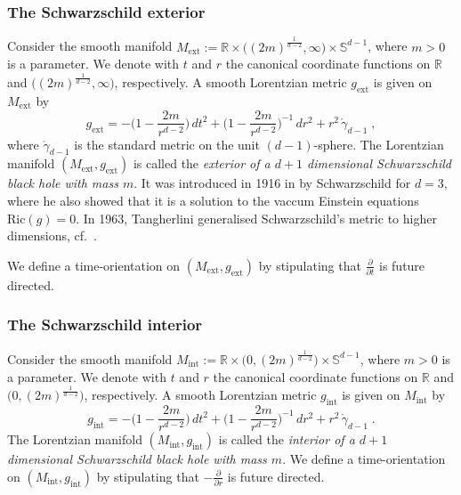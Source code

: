 \documentclass[reqno]{article}
\newcommand{\R}{\mathbb{R}}
\newcommand{\Mint}{M_{\mathrm{int}}}
\newcommand{\gint}{g_{\mathrm{int}}}
\newcommand{\Mext}{M_{\mathrm{ext}}}
\newcommand{\gext}{g_{\mathrm{ext}}}
\begin{document}
\subsubsection*{The Schwarzschild exterior}

Consider the smooth manifold $\Mext := \R \times \big((2m)^{\frac{1}{d-2}}, \infty\big) \times \mathbb{S}^{d-1}$, where $m>0$ is a parameter. We denote with $t$ and $r$ the canonical coordinate functions on $\R$ and $\big((2m)^{\frac{1}{d-2}}, \infty\big)$, respectively. A smooth Lorentzian metric $\gext$ is given on $\Mext$  by 
\begin{equation}
\label{SchwarzschildMetricExt}
\gext = -\big(1 - \frac{2m}{r^{d-2}}\big) \,dt^2 + \big(1 - \frac{2m}{r^{d-2}}\big)^{-1}\,dr^2 + r^2\, \mathring{\gamma}_{d-1} \;,
\end{equation}
where $\mathring{\gamma}_{d-1}$ is the standard metric on the unit $(d-1)$-sphere. 
The Lorentzian manifold $(\Mext,\gext)$ is called the \emph{exterior of a $d+1$ dimensional Schwarzschild black hole with mass $m$}. 
It was introduced in 1916 in \cite{Schw16} by Schwarzschild for $d=3$, where he also showed that it is a solution to the vaccum Einstein equations $\mathrm{Ric}(g) =0$. In 1963, Tangherlini generalised Schwarzschild's metric to higher dimensions, cf.\ \cite{Tang63}.

We define a time-orientation on $(\Mext, \gext)$ by stipulating that $\frac{\partial}{\partial t}$ is future directed.


\subsubsection*{The Schwarzschild interior}

Consider the smooth manifold $\Mint := \R \times \big(0,(2m)^{\frac{1}{d-2}}\big) \times \mathbb{S}^{d-1}$, where $m>0$ is a parameter. We denote with $t$ and $r$ the canonical coordinate functions on $\R$ and $\big(0,(2m)^{\frac{1}{d-2}}\big)$, respectively. A smooth Lorentzian metric $\gint$ is given on $\Mint$  by 
\begin{equation}
\label{SchwarzschildMetricInt}
\gint = -\big(1 - \frac{2m}{r^{d-2}}\big) \,dt^2 + \big(1 - \frac{2m}{r^{d-2}}\big)^{-1}\,dr^2 + r^2\, \mathring{\gamma}_{d-1} \;.
\end{equation}
The Lorentzian manifold $(\Mint,\gint)$ is called the \emph{interior of a $d+1$ dimensional Schwarzschild black hole with mass $m$}.  We define a time-orientation on $(\Mint,\gint)$ by stipulating that $-\frac{\partial}{\partial r}$ is future directed.
\end{document}
